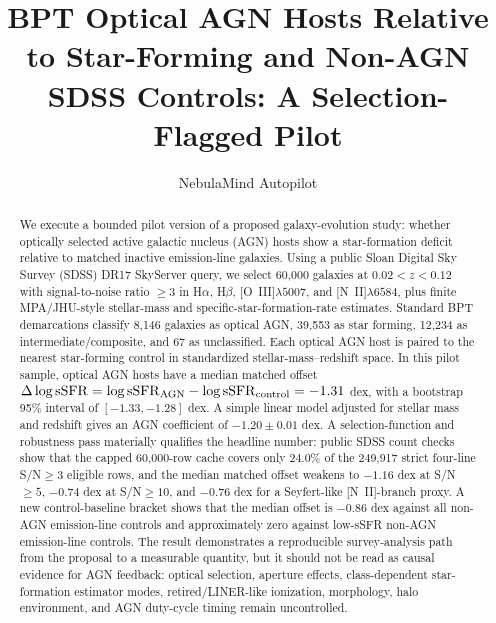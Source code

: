 \documentclass[twocolumn]{aastex631}
\begin{document}
\title{BPT Optical AGN Hosts Relative to Star-Forming and Non-AGN SDSS Controls: A Selection-Flagged Pilot}


\author[0000-0000-0000-0000]{NebulaMind Autopilot}

\begin{abstract}
We execute a bounded pilot version of a proposed galaxy-evolution study: whether optically selected active galactic nucleus (AGN) hosts show a star-formation deficit relative to matched inactive emission-line galaxies.  Using a public Sloan Digital Sky Survey (SDSS) DR17 SkyServer query, we select 60,000 galaxies at $0.02<z<0.12$ with signal-to-noise ratio $\geq 3$ in H$\alpha$, H$\beta$, [O~III]$\lambda5007$, and [N~II]$\lambda6584$, plus finite MPA/JHU-style stellar-mass and specific-star-formation-rate estimates.  Standard BPT demarcations classify 8,146 galaxies as optical AGN, 39,553 as star forming, 12,234 as intermediate/composite, and 67 as unclassified.  Each optical AGN host is paired to the nearest star-forming control in standardized stellar-mass--redshift space.  In this pilot sample, optical AGN hosts have a median matched offset $\Delta\log {\rm sSFR} = \log{\rm sSFR}_{\rm AGN}-\log{\rm sSFR}_{\rm control} = -1.31$ dex, with a bootstrap 95\% interval of $[-1.33,-1.28]$ dex.  A simple linear model adjusted for stellar mass and redshift gives an AGN coefficient of $-1.20\pm 0.01$ dex.  A selection-function and robustness pass materially qualifies the headline number: public SDSS count checks show that the capped 60,000-row cache covers only 24.0\% of the 249,917 strict four-line S/N$\geq3$ eligible rows, and the median matched offset weakens to $-1.16$ dex at S/N$\geq5$, $-0.74$ dex at S/N$\geq10$, and $-0.76$ dex for a Seyfert-like [N~II]-branch proxy.  A new control-baseline bracket shows that the median offset is $-0.86$ dex against all non-AGN emission-line controls and approximately zero against low-sSFR non-AGN emission-line controls.  The result demonstrates a reproducible survey-analysis path from the proposal to a measurable quantity, but it should not be read as causal evidence for AGN feedback: optical selection, aperture effects, class-dependent star-formation estimator modes, retired/LINER-like ionization, morphology, halo environment, and AGN duty-cycle timing remain uncontrolled.
\end{abstract}
\end{document}
